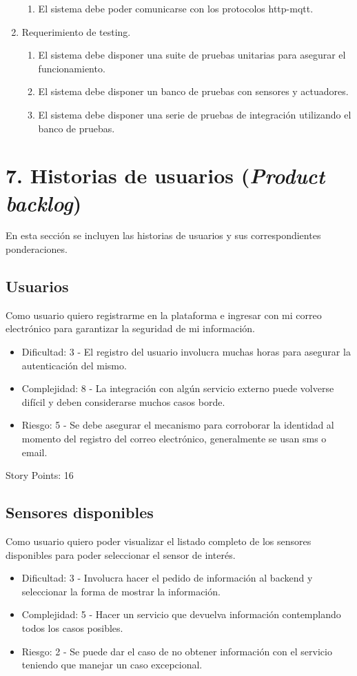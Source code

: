 \documentclass[
11pt, %
]{charter}
\begin{document}
\begin{enumerate}
\begin{enumerate}
			\item El sistema debe poder comunicarse con los protocolos http-mqtt.
		\end{enumerate}
	\item Requerimiento de testing.
		\begin{enumerate}
			\item El sistema debe disponer una suite de pruebas unitarias para asegurar el funcionamiento.
			\item El sistema debe disponer un banco de pruebas con sensores y actuadores.
			\item El sistema debe disponer una serie de pruebas de integración utilizando el banco de pruebas.
		\end{enumerate}
\end{enumerate}

\section{7. Historias de usuarios (\textit{Product backlog})}
\label{sec:backlog}

En esta sección se incluyen las historias de usuarios y sus correspondientes ponderaciones.

\subsection{Usuarios}
Como usuario quiero registrarme en la plataforma e ingresar con mi correo electrónico para garantizar la seguridad de mi información.
\begin{itemize}
	\item Dificultad: 3 - El registro del usuario involucra muchas horas para asegurar la autenticación del mismo.
	\item Complejidad: 8 - La integración con algún servicio externo puede volverse difícil y deben considerarse muchos casos borde.
	\item Riesgo: 5 - Se debe asegurar el mecanismo para corroborar la identidad al momento del registro del correo electrónico, generalmente se usan sms o email.
\end{itemize}
Story Points: 16

\subsection{Sensores disponibles}
Como usuario quiero poder visualizar el listado completo de los sensores disponibles para poder seleccionar el sensor de interés.
\begin{itemize}
	\item Dificultad: 3 - Involucra hacer el pedido de información al backend y seleccionar la forma de mostrar la información.
	\item Complejidad: 5 - Hacer un servicio que devuelva información contemplando todos los casos posibles.
	\item Riesgo: 2 - Se puede dar el caso de no obtener información con el servicio teniendo que manejar un caso excepcional.
\end{itemize}
\end{document}
